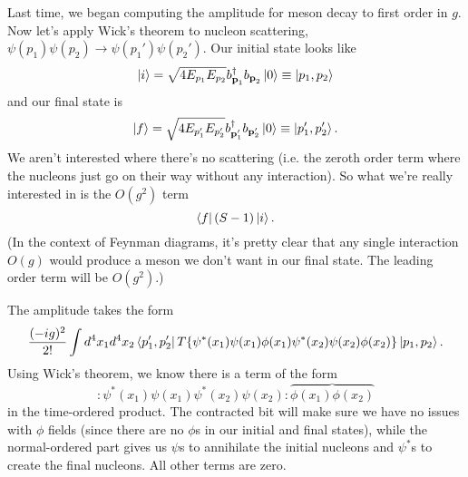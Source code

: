 Last time, we began computing the amplitude for meson decay to first order in $g$. Now let's apply Wick's theorem to nucleon scattering, $\psi(p_1)\psi(p_2)\to \psi(p_1')\psi(p_2').$
Our initial state looks like
$$\left| i \right>=\sqrt{4 E_{p_1} E_{p_2}}b_{\boldsymbol{\mathbf{p}}_1}^\dagger b_{\boldsymbol{\mathbf{p}}_2} \left| 0 \right> \equiv \left| p_1,p_2 \right>$$
and our final state is
$$\left| f \right>=\sqrt{4 E_{p_1'} E_{p_2'}}b_{\boldsymbol{\mathbf{p}}_1'}^\dagger b_{\boldsymbol{\mathbf{p}}_2'} \left| 0 \right> \equiv \left| p_1',p_2' \right>.$$
We aren't interested where there's no scattering (i.e. the zeroth order term where the nucleons just go on their way without any interaction). So what we're really interested in is the $O(g^2)$ term
$$\left< f \right|(S-1)\left| i \right>.$$
(In the context of Feynman diagrams, it's pretty clear that any single interaction $O(g)$ would produce a meson we don't want in our final state. The leading order term will be $O(g^2)$.)

The amplitude takes the form
$$\frac{(-ig)^2}{2!}\int d^4x_1 d^4x_2 \left< p_1',p_2' \right|T\{\psi^*(x_1)\psi(x_1) \phi(x_1) \psi^*(x_2) \psi(x_2)\phi(x_2)\}\left| p_1,p_2 \right>.$$
Using Wick's theorem, we know there is a term of the form
$$:\psi^*(x_1)\psi(x_1)\psi^*(x_2)\psi(x_2): \overbrace{\phi(x_1)\phi(x_2)}$$
in the time-ordered product. The contracted bit will make sure we have no issues with $\phi$ fields (since there are no $\phi$s in our initial and final states), while the normal-ordered part gives us $\psi$s to annihilate the initial nucleons and $\psi^*$s to create the final nucleons. All other terms are zero.

